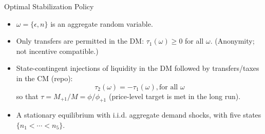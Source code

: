 \documentclass[10pt,english,slidetop,compress,
              blue,mathserif,color=option]{beamer}
\theoremstyle{plain}
\theoremstyle{definition}
\begin{document}
\begin{frame}[allowframebreaks]{Optimal Stabilization Policy}
\begin{itemize}
    \item $\omega = \{\epsilon, n\}$ is an aggregate random variable. 
    
    \item Only transfers are permitted in the DM: $\tau_{1}(\omega) \geq 0$ for all $\omega$. (Anonymity; not incentive compatible.)
  
    \item State-contingent injections of liquidity in the DM followed by transfers/taxes in the CM (repo): 
      \[
        \tau_{2}(\omega) = -\tau_{1}(\omega),  \text{for all } \omega
      \]
    so that $\tau = M_{+1}/M = \phi/\phi_{+1}$ (price-level target is met in the long run).
    
    \item A stationary equilibrium with i.i.d. aggregate demand shocks, with five states $\{n_{1} < \cdots < n_{5}\}$.
  \end{itemize}


    
  




\end{frame}
\end{document}

